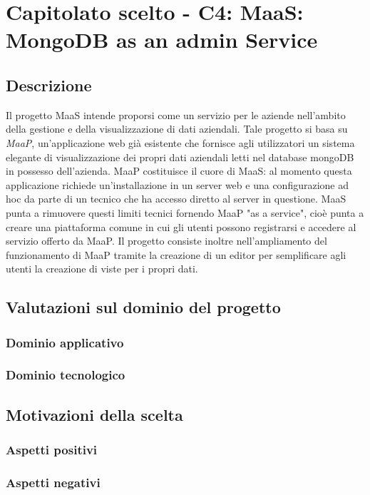 \section{Capitolato scelto - C4: MaaS: MongoDB as an admin Service}
\subsection{Descrizione}
Il progetto MaaS intende proporsi come un servizio per le aziende nell'ambito della gestione e della visualizzazione di dati aziendali. 
Tale progetto si basa su \textit{MaaP}, un'applicazione web gi\`a esistente che fornisce agli utilizzatori un sistema elegante di visualizzazione
dei propri dati aziendali letti nel database mongoDB in possesso dell'azienda.
MaaP costituisce il cuore di MaaS: al momento questa applicazione richiede un'installazione in un server web e 
una configurazione ad hoc da parte di un tecnico che ha accesso diretto al server in questione. MaaS punta a rimuovere 
questi limiti tecnici fornendo MaaP "as a service", cioè punta a creare una piattaforma comune in cui gli utenti possono 
registrarsi e accedere al servizio offerto da MaaP. Il progetto consiste inoltre nell'ampliamento del funzionamento di MaaP tramite la creazione di 
un editor per semplificare agli utenti la creazione di viste per i propri dati.


\subsection{Valutazioni sul dominio del progetto}
\subsubsection{Dominio applicativo}

\subsubsection{Dominio tecnologico}
\begin{itemize}
\end{itemize}


\subsection{Motivazioni della scelta}
\subsubsection{Aspetti positivi}

\subsubsection{Aspetti negativi}

